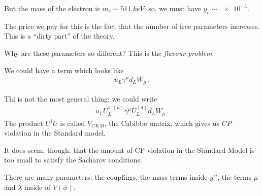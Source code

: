 \documentclass[main.tex]{subfiles}
\begin{document}
But the mass of the electron is \(m_e \sim \SI{511}{keV}\): so, we must have \(y_e \sim \num{e-5}\). 

The price we pay for this is the fact that the number of free parameters increases. This is a ``dirty part'' of the theory.

Why are these parameters so different? This is the \emph{flavour problem}.

We could have a term which looks like 
%
\begin{align}
\overline{u}_{L} \gamma^{\mu } d_{L} W_{\mu }
\,.
\end{align}

Thi is not the most general thing: we could write 
%
\begin{align}
\overline{u}_{L} U_{L} ^{\dag, (u)} \gamma^{\mu } U_{L}^{(d)} d_{L} W_{\mu }
\,.
\end{align}
%
The product \(U ^\dag U\) is called \(V_{CKM}\), the Cabibbo matrix, which gives us \(CP\) violation in the Standard model.

It does seem, though, that the amount of CP violation in the Standard Model is too small to satisfy the Sacharov conditions.

There are many parameters: the couplings, the mass terms inside \(y^{ij}\), the terms \(\mu \) and \(\lambda \) inside of \(V(\phi )\).
\end{document}
